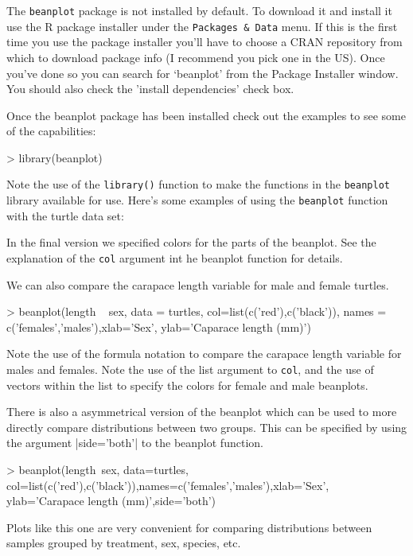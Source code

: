 The \lstinline!beanplot! package is not installed by default. To
download it and install it use the R package installer under the
\lstinline!Packages & Data! menu. If this
is the first time you use the package installer you'll have to choose a
CRAN repository from which to download package info (I recommend you
pick one in the US). Once you've done so you can search for `beanplot'
from the Package Installer window. You should also check the 'install
dependencies' check box.

Once the beanplot package has been installed check out the examples to
see some of the capabilities:

\begin{R}
> library(beanplot)
\end{R}

Note the use of the \lstinline!library()! function to make the functions
in the \lstinline!beanplot! library available for use. Here's some
examples of using the \lstinline!beanplot! function with the turtle data
set:

In the final version we specified colors for the parts of the beanplot.
See the explanation of the \lstinline!col! argument int he beanplot
function for details.

We can also compare the carapace length variable for male and female
turtles.

\begin{R}
> beanplot(length ~ sex, data = turtles, col=list(c('red'),c('black')),
names = c('females','males'),xlab='Sex', ylab='Caparace length (mm)')
\end{R}
Note the use of the formula notation to compare the carapace length
variable for males and females. Note  the use of the list
argument to \lstinline!col!, and the use of vectors within the list to
specify the colors for female and male beanplots.

There is also a asymmetrical version of the beanplot which can be used to more directly compare distributions between two groups. This can be specified by using the argument |side='both'| to the beanplot function.
%
\begin{R}
> beanplot(length~sex, data=turtles, col=list(c('red'),c('black')),names=c('females','males'),xlab='Sex', ylab='Carapace length (mm)',side='both')
\end{R}
%
Plots like this one are very convenient for comparing distributions between samples grouped by treatment, sex, species, etc.

